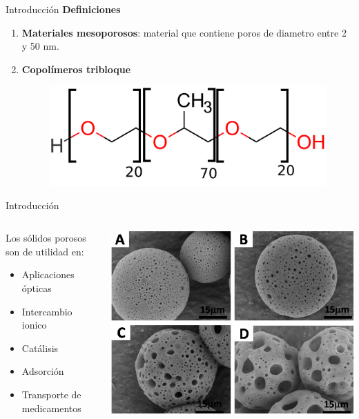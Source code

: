 \documentclass[handout]{beamer}
\begin{document}
\begin{frame}{Introducci\'on}
	\textbf{Definiciones}
	\begin{enumerate}
		\item \textbf{Materiales mesoporosos}: material que contiene poros de diametro entre 2 y 50 nm.
		\item \textbf{Copol\'imeros tribloque}
		\begin{figure}[h]
			\centering
			\includegraphics[width=0.5\linewidth]{../structures/Pluronic.png}
		\end{figure}
	\end{enumerate}
\end{frame}
\begin{frame}{Introducci\'on}
	\begin{columns}
		\begin{column}{0.5\linewidth}
			Los s\'olidos porosos son de utilidad en:
			\begin{itemize}
				\item Aplicaciones \'opticas
				\item Intercambio ionico
				\item Cat\'alisis
				\item Adsorci\'on
				\item Transporte de medicamentos
			\end{itemize}
		\end{column}
		\begin{column}{0.5\textwidth}
			\includegraphics[width=\linewidth]{poros.png}
		\end{column}
	\end{columns}
\end{frame}
\end{document}
